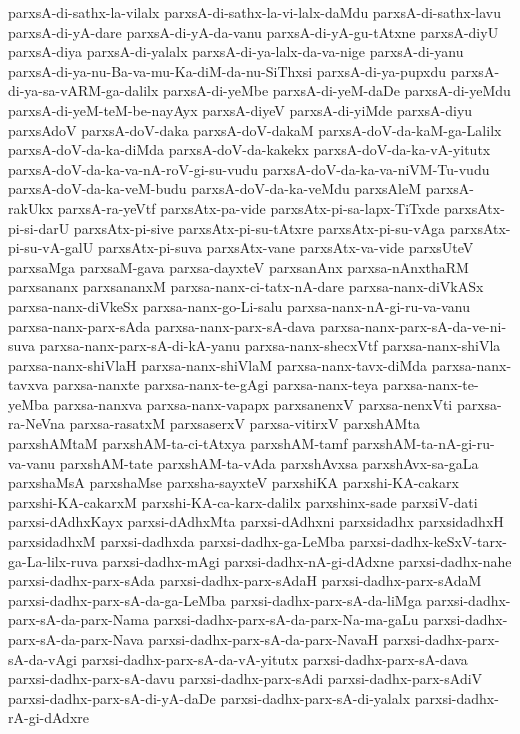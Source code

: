 {parxsA-di-sathx-la-vilalx
parxsA-di-sathx-la-vi-lalx-daMdu
parxsA-di-sathx-lavu
parxsA-di-yA-dare
parxsA-di-yA-da-vanu
parxsA-di-yA-gu-tAtxne
parxsA-diyU
parxsA-diya
parxsA-di-yalalx
parxsA-di-ya-lalx-da-va-nige
parxsA-di-yanu
parxsA-di-ya-nu-Ba-va-mu-Ka-diM-da-nu-SiThxsi
parxsA-di-ya-pupxdu
parxsA-di-ya-sa-vARM-ga-dalilx
parxsA-di-yeMbe
parxsA-di-yeM-daDe
parxsA-di-yeMdu
parxsA-di-yeM-teM-be-nayAyx
parxsA-diyeV
parxsA-di-yiMde
parxsA-diyu
parxsAdoV
parxsA-doV-daka
parxsA-doV-dakaM
parxsA-doV-da-kaM-ga-Lalilx
parxsA-doV-da-ka-diMda
parxsA-doV-da-kakekx
parxsA-doV-da-ka-vA-yitutx
parxsA-doV-da-ka-va-nA-roV-gi-su-vudu
parxsA-doV-da-ka-va-niVM-Tu-vudu
parxsA-doV-da-ka-veM-budu
parxsA-doV-da-ka-veMdu
parxsAleM
parxsA-rakUkx
parxsA-ra-yeVtf
parxsAtx-pa-vide
parxsAtx-pi-sa-lapx-TiTxde
parxsAtx-pi-si-darU
parxsAtx-pi-sive
parxsAtx-pi-su-tAtxre
parxsAtx-pi-su-vAga
parxsAtx-pi-su-vA-galU
parxsAtx-pi-suva
parxsAtx-vane
parxsAtx-va-vide
parxsUteV
parxsaMga
parxsaM-gava
parxsa-dayxteV
parxsanAnx
parxsa-nAnxthaRM
parxsananx
parxsananxM
parxsa-nanx-ci-tatx-nA-dare
parxsa-nanx-diVkASx
parxsa-nanx-diVkeSx
parxsa-nanx-go-Li-salu
parxsa-nanx-nA-gi-ru-va-vanu
parxsa-nanx-parx-sAda
parxsa-nanx-parx-sA-dava
parxsa-nanx-parx-sA-da-ve-ni-suva
parxsa-nanx-parx-sA-di-kA-yanu
parxsa-nanx-shecxVtf
parxsa-nanx-shiVla
parxsa-nanx-shiVlaH
parxsa-nanx-shiVlaM
parxsa-nanx-tavx-diMda
parxsa-nanx-tavxva
parxsa-nanxte
parxsa-nanx-te-gAgi
parxsa-nanx-teya
parxsa-nanx-te-yeMba
parxsa-nanxva
parxsa-nanx-vapapx
parxsanenxV
parxsa-nenxVti
parxsa-ra-NeVna
parxsa-rasatxM
parxsaserxV
parxsa-vitirxV
parxshAMta
parxshAMtaM
parxshAM-ta-ci-tAtxya
parxshAM-tamf
parxshAM-ta-nA-gi-ru-va-vanu
parxshAM-tate
parxshAM-ta-vAda
parxshAvxsa
parxshAvx-sa-gaLa
parxshaMsA
parxshaMse
parxsha-sayxteV
parxshiKA
parxshi-KA-cakarx
parxshi-KA-cakarxM
parxshi-KA-ca-karx-dalilx
parxshinx-sade
parxsiV-dati
parxsi-dAdhxKayx
parxsi-dAdhxMta
parxsi-dAdhxni
parxsidadhx
parxsidadhxH
parxsidadhxM
parxsi-dadhxda
parxsi-dadhx-ga-LeMba
parxsi-dadhx-keSxV-tarx-ga-La-lilx-ruva
parxsi-dadhx-mAgi
parxsi-dadhx-nA-gi-dAdxne
parxsi-dadhx-nahe
parxsi-dadhx-parx-sAda
parxsi-dadhx-parx-sAdaH
parxsi-dadhx-parx-sAdaM
parxsi-dadhx-parx-sA-da-ga-LeMba
parxsi-dadhx-parx-sA-da-liMga
parxsi-dadhx-parx-sA-da-parx-Nama
parxsi-dadhx-parx-sA-da-parx-Na-ma-gaLu
parxsi-dadhx-parx-sA-da-parx-Nava
parxsi-dadhx-parx-sA-da-parx-NavaH
parxsi-dadhx-parx-sA-da-vAgi
parxsi-dadhx-parx-sA-da-vA-yitutx
parxsi-dadhx-parx-sA-dava
parxsi-dadhx-parx-sA-davu
parxsi-dadhx-parx-sAdi
parxsi-dadhx-parx-sAdiV
parxsi-dadhx-parx-sA-di-yA-daDe
parxsi-dadhx-parx-sA-di-yalalx
parxsi-dadhx-rA-gi-dAdxre
}
